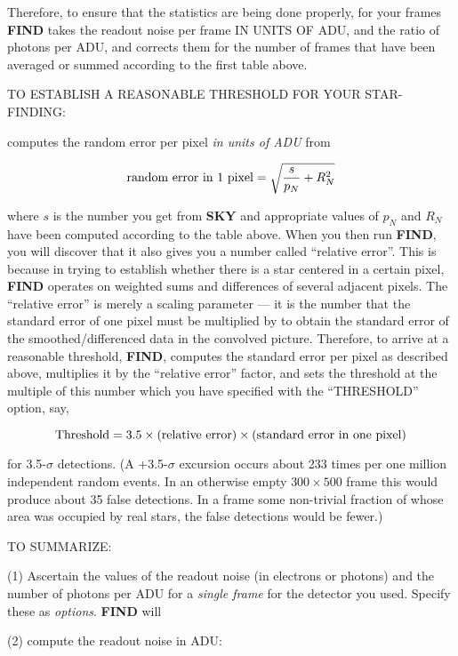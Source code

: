 Therefore, to ensure that the statistics are being done properly, for
your frames {\bf FIND} takes the readout noise per frame IN UNITS OF
ADU, and the ratio of photons per ADU, and corrects them for the number
of frames that have been averaged or summed according to the first
table above.

\vfill
\eject
\noindent TO ESTABLISH A REASONABLE THRESHOLD FOR YOUR STAR-FINDING:
\medskip

 computes the random error per pixel {\it in units
of ADU} from

$$
\hbox{\rm random error in 1 pixel} = \sqrt{ {s\over p_N } + R_N^2}
$$

\noindent where $s$ is the number you get from {\bf SKY} and
appropriate values of $p_N$ and $R_N$ have been computed according to
the table above.  When you then run {\bf FIND}, you will discover that
it also gives you a number called ``relative error''.  This is because
in trying to establish whether there is a star centered in a certain
pixel, {\bf FIND} operates on weighted sums and differences of several
adjacent pixels.  The ``relative error'' is merely a scaling parameter
--- it is the number that the standard error of one pixel must be
multiplied by to obtain the standard error of the smoothed/differenced
data in the convolved picture.  Therefore, to arrive at a reasonable
threshold, {\bf FIND}, computes the standard error per pixel as
described above, multiplies it by the ``relative error'' factor, and
sets the threshold at the multiple of this number which you have
specified with the ``THRESHOLD'' option, say,

$$\hbox{\rm Threshold} = 3.5 \times (\hbox{\rm relative error})
\times (\hbox{\rm standard error in one pixel}) $$

\noindent for 3.5-$\sigma$ detections.  (A +3.5-$\sigma$ excursion
occurs about 233 times per one million independent random events.  In
an otherwise empty $300 \times  500$ frame this would produce about 35
false detections.  In a frame some non-trivial fraction of whose area
was occupied by real stars, the false detections would be fewer.)

\vfill
\eject
\noindent TO SUMMARIZE:

\item{(1)} Ascertain the values of the readout noise (in electrons or
photons) and the number of photons per ADU for a {\it single frame} for the
detector you used.  Specify these as {\it options\/}.  {\bf FIND} will

\item{(2)} compute the readout noise in ADU:

